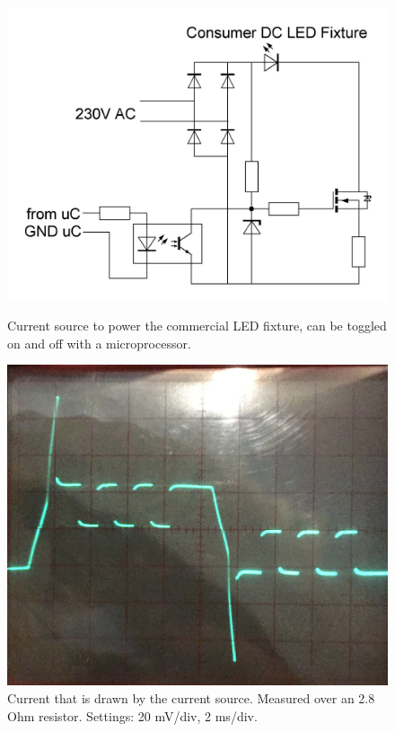 	\begin{figure}[!tbp]
	  \centering
	  \begin{minipage}[b]{0.49\textwidth}
	    \includegraphics[width=\textwidth]{chapters/hardware-chapters/custom-modulator-current-source.JPG}
		\caption{Current source to power the commercial LED fixture, can be toggled on and off with a microprocessor.}
		\label{fig:custom-modulator-current-source}
	  \end{minipage}
	  \hfill
	  \begin{minipage}[b]{0.49\textwidth}
	    \includegraphics[width=\textwidth]{chapters/hardware-chapters/current-source-measurement.png}
	    \caption{Current that is drawn by the current source. Measured over an 2.8 Ohm resistor. Settings: 20 mV/div, 2 ms/div.}
		\label{fig:current-source-measurement}
	  \end{minipage}
	\end{figure}


